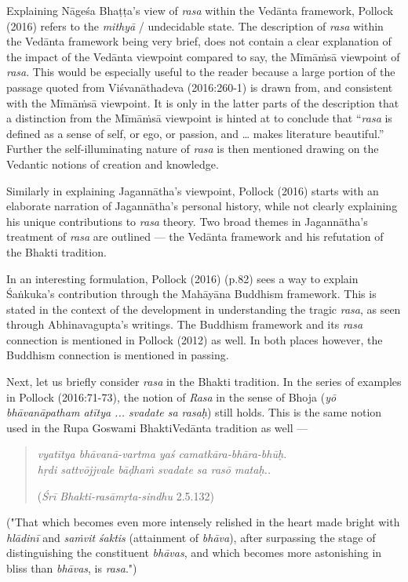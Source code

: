 Explaining Nāgeśa Bhaṭṭa’s view of \textsl{rasa} within the Vedānta framework, Pollock (2016) refers to the \textsl{mithyā} / undecidable state. The description of \textsl{rasa} within the Vedānta framework being very brief, does not contain a clear explanation of the impact of the Vedānta viewpoint compared to say, the Mīmāṁsā viewpoint of \textsl{rasa}. This would be especially useful to the reader because a large portion of the passage quoted from Viśvanāthadeva (2016:260-1) is drawn from, and consistent with the Mīmāṁsā viewpoint. It is only in the latter parts of the description that a distinction from the Mīmāṁsā viewpoint is hinted at to conclude that “\textsl{rasa} is defined as a sense of self, or ego, or passion, and … makes literature beautiful.” Further the self-illuminating nature of \textsl{rasa} is then mentioned drawing on the Vedantic notions of creation and knowledge. 

Similarly in explaining Jagannātha’s viewpoint, Pollock (2016) starts with an elaborate narration of Jagannātha’s personal history, while not clearly explaining his unique contributions to \textsl{rasa} theory. Two broad themes in Jagannātha’s treatment of \textsl{rasa} are outlined --- the Vedānta framework and his refutation of the Bhakti tradition. 

In an interesting formulation, Pollock (2016) (p.82) sees a way to explain Śaṅkuka’s contribution through the Mahāyāna Buddhism framework. This is stated in the context of the development in understanding the tragic \textsl{rasa}, as seen through Abhinavagupta’s writings. The Buddhism framework and its \textsl{rasa} connection is mentioned in Pollock (2012) as well. In both places however, the Buddhism connection is mentioned in passing. 

Next, let us briefly consider \textsl{rasa} in the Bhakti tradition. In the series of examples in Pollock (2016:71-73), the notion of \textsl{Rasa} in the sense of Bhoja (\textsl{yō bhāvanāpatham atītya ... svadate sa rasaḥ}) still holds. This is the same notion used in the Rupa Goswami BhaktiVedānta tradition as well --- 

\newpage
\begin{quote}
\textsl{vyatītya bhāvanā-vartma yaś camatkāra-bhāra-bhūḥ.}\\
\textsl{hṛdi sattvōjjvale bāḍhaṁ svadate sa rasō mataḥ..}

\hfill (\textsl{Śrī Bhakti-rasāmṛta-sindhu} 2.5.132)
\end{quote}

("That which becomes even more intensely relished in the heart made bright with \textsl{hlādinī} and \textsl{saṁvit} \textsl{śaktis} (attainment of \textsl{bhāva}), after surpassing the stage of distinguishing the constituent \textsl{bhāvas}, and which becomes more astonishing in bliss than \textsl{bhāvas}, is \textsl{rasa}.")

